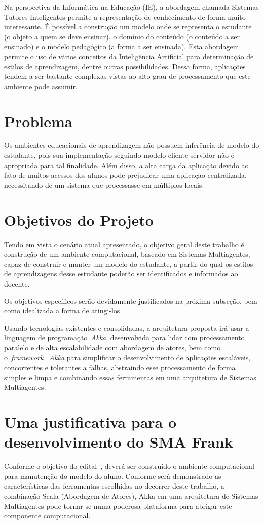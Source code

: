 Na perspectiva da Informática na Educação (IE), a abordagem chamada Sistemas Tutores Inteligentes permite a representação de conhecimento de forma muito interessante. É possível a construção um modelo onde se representa o estudante (o objeto a quem se deve ensinar), o domínio do conteúdo (o conteúdo a ser ensinado) e o modelo pedagógico (a forma a ser ensinada). Esta abordagem permite o uso de vários conceitos da Inteligência Artificial para determinação de estilos de aprendizagem, dentre outras possibilidades. Dessa forma, aplicações tendem a ser bastante complexas vistas ao alto grau de processamento que este ambiente pode assumir.

\section{Problema}
Os ambientes educacionais de aprendizagem não possuem inferência de modelo do estudante, pois sua implementação seguindo modelo cliente-servidor não é apropriada para tal finalidade. Além disso, a alta carga da aplicação devido ao fato de muitos acessos dos alunos pode prejudicar uma aplicaçao centralizada, necessitando de um sistema que processasse em múltiplos locais.


\section{Objetivos do Projeto}
Tendo em vista o cenário atual apresentado, o objetivo geral deste trabalho é construção de um ambiente computacional, baseado em Sistemas Multiagentes, capaz de construir e manter um modelo do estudante, a partir do qual os estilos de aprendizagens desse estudante poderão ser identificados e informados ao docente.

Os objetivos específicos serão devidamente justificados na próxima subseção, bem como idealizada a forma de atingi-los.

Usando tecnologias existentes e consolidadas, a arquitetura proposta irá usar a linguagem de programação~\emph{Akka}, desenvolvida para lidar com processamento paralelo e de alta escalabilidade com abordagem de atores, bem como o~\emph{framework} ~\emph{Akka} para simplificar o desenvolvimento de aplicações escaláveis, concorrentes e tolerantes a falhas, abstraindo esse processamento de forma simples e limpa e combinando essas ferramentas em uma arquitetura de Sistemas Multiagentes.

\section{Uma justificativa para o desenvolvimento do SMA Frank}
Conforme o objetivo do edital~\cite{editalFrank}, deverá ser construído o ambiente computacional para manutenção do modelo do aluno. Conforme será demonstrado as características das ferramentas escolhidas no decorrer deste trabalho, a combinação Scala (Abordagem de Atores), Akka em uma arquitetura de Sistemas Multiagentes pode tornar-se numa poderosa plataforma para abrigar este componente computacional.

